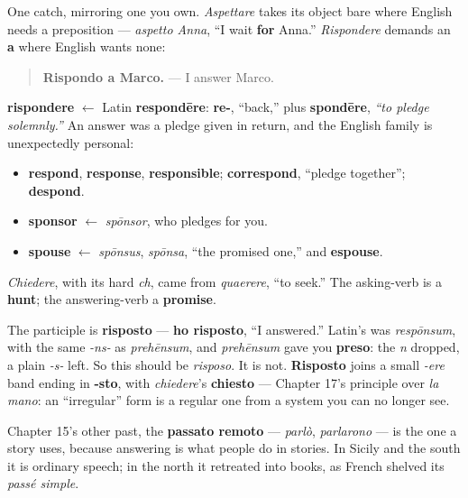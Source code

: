 One catch, mirroring one you own. \emph{Aspettare} takes its object bare where English needs a preposition — \emph{aspetto Anna}, \textquotedblleft{}I wait \textbf{for} Anna.\textquotedblright{} \emph{Rispondere} demands an \textbf{a} where English wants none:

\begin{quote}
\textbf{Rispondo a Marco.} — I answer Marco.
\end{quote}

\begin{cousinweb}
\textbf{rispondere} $\leftarrow$ Latin \textbf{respondēre}: \textbf{re-}, \textquotedblleft{}back,\textquotedblright{} plus \textbf{spondēre}, \emph{\textquotedblleft{}to pledge solemnly.\textquotedblright{}} An answer was a pledge given in return, and the English family is unexpectedly personal:

\begin{itemize}
\raggedright
  \item \textbf{respond}, \textbf{response}, \textbf{responsible}; \textbf{correspond}, \textquotedblleft{}pledge together\textquotedblright{}; \textbf{despond}.
  \item \textbf{sponsor} $\leftarrow$ \emph{spōnsor}, who pledges for you.
  \item \textbf{spouse} $\leftarrow$ \emph{spōnsus}, \emph{spōnsa}, \textquotedblleft{}the promised one,\textquotedblright{} and \textbf{espouse}.
\end{itemize}

\emph{Chiedere}, with its hard \emph{ch}, came from \emph{quaerere}, \textquotedblleft{}to seek.\textquotedblright{} The asking-verb is a \textbf{hunt}; the answering-verb a \textbf{promise}.
\end{cousinweb}

\begin{grammarlens}[title={Grammar Lens: the participle, and which past a story uses}]
The participle is \textbf{risposto} — \textbf{ho risposto}, \textquotedblleft{}I answered.\textquotedblright{} Latin's was \emph{respōnsum}, with the same \emph{-ns-} as \emph{prehēnsum}, and \emph{prehēnsum} gave you \textbf{preso}: the \emph{n} dropped, a plain \emph{-s-} left. So this should be \emph{risposo}. It is not. \textbf{Risposto} joins a small \emph{-ere} band ending in \textbf{-sto}, with \emph{chiedere}'s \textbf{chiesto} — Chapter 17's principle over \emph{la mano}: an \textquotedblleft{}irregular\textquotedblright{} form is a regular one from a system you can no longer see.

Chapter 15's other past, the \textbf{passato remoto} — \emph{parlò}, \emph{parlarono} — is the one a story uses, because answering is what people do in stories. In Sicily and the south it is ordinary speech; in the north it retreated into books, as French shelved its \emph{passé simple}.
\end{grammarlens}

